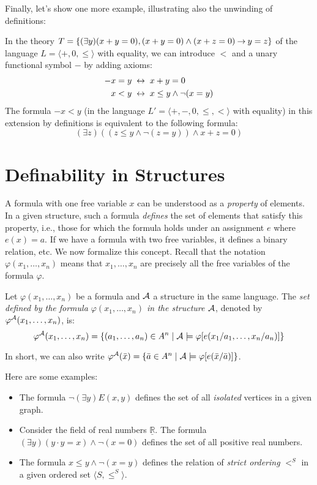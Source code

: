 Finally, let's show one more example, illustrating also the unwinding of definitions:
\begin{example}
    In the theory $T=\{(\exists y)(x+y=0),(x+y=0)\land(x+z=0)\mathbin{\rightarrow} y=z\}$ of the language $L=\langle +,0,\leq\rangle$ with equality, we can introduce $<$ and a unary functional symbol $-$ by adding axioms:
    \begin{align*}
        -x=y\ &\mathbin{\leftrightarrow}\ x+y=0\\
        x<y\ &\mathbin{\leftrightarrow}\ x\leq y\land\neg(x=y)
    \end{align*}
    The formula $-x<y$ (in the language $L'=\langle +,-,0,\leq,<\rangle$ with equality) in this extension by definitions is equivalent to the following formula:
    $$
    (\exists z)((z\leq y\land\neg(z=y))\land x+z=0)
    $$
\end{example}


\section{Definability in Structures}\label{section:definability}

A formula with one free variable $x$ can be understood as a \emph{property} of elements. In a given structure, such a formula \emph{defines} the set of elements that satisfy this property, i.e., those for which the formula holds under an assignment $e$ where $e(x)=a$. If we have a formula with two free variables, it defines a binary relation, etc. We now formalize this concept. Recall that the notation $\varphi(x_1,\dots,x_n)$ means that $x_1,\dots,x_n$ are precisely all the free variables of the formula $\varphi$.

\begin{definition}
    Let $\varphi(x_1,\dots,x_n)$ be a formula and $\mathcal{A}$ a structure in the same language. The \emph{set defined by the formula $\varphi(x_1,\dots,x_n)$ in the structure $\mathcal{A}$}, denoted by $\varphi^{\mathcal{A}}(x_1,\dots,x_n)$, is:
    $$
    \varphi^{\mathcal{A}}(x_1,\dots,x_n)=\{(a_1,\dots,a_n)\in A^n\mid\mathcal{A}\models\varphi[e(x_1/a_1,\dots,x_n/a_n)]\}
    $$
\end{definition}
In short, we can also write $\varphi^{\mathcal{A}}(\bar x)=\{\bar a\in A^n\mid\mathcal{A}\models\varphi[e(\bar x/\bar a)]\}$.

\begin{example} Here are some examples:
    \begin{itemize}
        \item The formula $\neg(\exists y)E(x,y)$ defines the set of all \emph{isolated} vertices in a given graph.
        \item Consider the field of real numbers $\underline{\mathbb R}$. The formula $(\exists y)(y\cdot y=x)\land\neg (x=0)$ defines the set of all positive real numbers.
        \item The formula $x\leq y\land \neg (x=y)$ defines the relation of \emph{strict ordering} $<^S$ in a given ordered set $\langle S,\leq^S\rangle$.
    \end{itemize}
\end{example}

